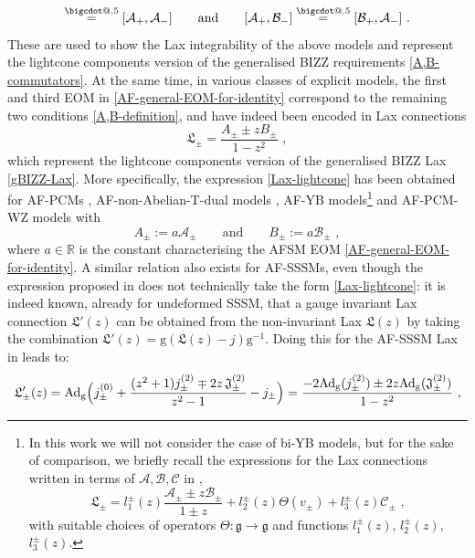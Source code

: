\documentclass[12pt]{article}
\makeatletter
\newcommand*\bigcdot{\mathpalette\bigcdot@{.5}}
\newcommand*\bigcdot@[2]{\mathbin{\vcenter{\hbox{\scalebox{#2}{$\m@th#1\bullet$}}}}}
\newcommand{\deq}{\stackrel{\bigcdot}{=}}
\numberwithin{equation}{section}
\makeatother
\begin{document}
\begin{equation}
[\mathcal{B}_{+},\mathcal{B}_{-}]\deq [\mathcal{A}_{+},\mathcal{A}_{-}]
\qquad \text{and} \qquad 
[\mathcal{A}_{+},\mathcal{B}_{-}]\deq [\mathcal{B}_{+},\mathcal{A}_{-}] \,\, .
\end{equation}
These are used to show the Lax integrability of the above models and represent the lightcone components version of the generalised BIZZ requirements \eqref{A,B-commutators}. At the same time, in various classes of explicit models, the first and third EOM in \eqref{AF-general-EOM-for-identity} correspond to the remaining two conditions \eqref{A,B-definition}, and have indeed been encoded in Lax connections 
\begin{equation}\label{Lax-lightcone}
\mathfrak{L}_{\pm}=\frac{A_{\pm}\pm zB_{\pm}}{1-z^2} \,\, ,
\end{equation}
which represent the lightcone components version of the generalised BIZZ Lax \eqref{gBIZZ-Lax}.
More specifically, the expression \eqref{Lax-lightcone} has been obtained for AF-PCMs \cite{Ferko:2024ali}, AF-non-Abelian-T-dual models \cite{Bielli:2024khq,Bielli:2024ach}, AF-YB models\footnote{In this work we will not consider the case of bi-YB models, but for the sake of comparison, we briefly recall the expressions for the Lax connections written in terms of $\mathcal{A,B,C}$ in \cite{Bielli:2025uiv}, 
\begin{equation}\label{common-Lax}
\mathfrak{L}_{\pm}=l_{1}^{\pm}(z)\frac{\mathcal{A}_{\pm}\pm z\mathcal{B}_{\pm}}{1\pm z} + l_{2}^{\pm}(z)\Theta(v_{\pm})+l_{3}^{\pm}(z) \mathcal{C}_{\pm} \,\, ,
\end{equation}
with suitable choices of operators $\Theta:\mathfrak{g}\rightarrow\mathfrak{g}$ and functions $l^\pm_1(z)$, $l^\pm_2(z)$, $l^\pm_3(z)$.} \cite{Bielli:2024fnp} and AF-PCM-WZ models \cite{Bielli:2024ach} with 
\begin{equation}\label{A,B-identifications-PCM-TD-YB-PCMWZ}
A_{\pm}:=a\mathcal{A}_{\pm}
\qquad \text{and} \qquad 
B_{\pm}:=a\mathcal{B}_{\pm}
\,\, ,
\end{equation}
where $a\in \mathbb{R}$ is the constant characterising the AFSM EOM \eqref{AF-general-EOM-for-identity}. A similar relation also exists for AF-SSSMs, even though the expression proposed in \cite{Bielli:2024oif} does not technically take the form \eqref{Lax-lightcone}: it is indeed known, already for undeformed SSSM, that a gauge invariant Lax connection $\mathfrak{L}'(z)$ can be obtained from the non-invariant Lax $\mathfrak{L}(z)$ by taking the combination $\mathfrak{L}'(z)=\mathrm{g}(\mathfrak{L}(z)-j)\mathrm{g}^{-1}$. Doing this for the AF-SSSM Lax in \cite{Bielli:2024oif} leads to: \begin{equation}
\begin{aligned}\label{Lax-gauge-transformation-AF-SSSM}
\mathfrak{L}_{\pm}'(z)=\mathrm{Ad}_{\mathrm{g}}\Bigl( j_{\pm}^{(0)}+\frac{(z^2+1)j_{\pm}^{(2)}\mp2z\, \mathfrak{J}_{\pm}^{(2)}}{z^2-1} -j_{\pm}\Bigr) =\frac{-2\mathrm{Ad}_{\mathrm{g}}(j_{\pm}^{(2)})\pm 2z \mathrm{Ad}_{\mathrm{g}}(\mathfrak{J}_{\pm}^{(2)})}{1-z^2} \,\, ,
\end{aligned}
\end{equation} 
\end{document}
